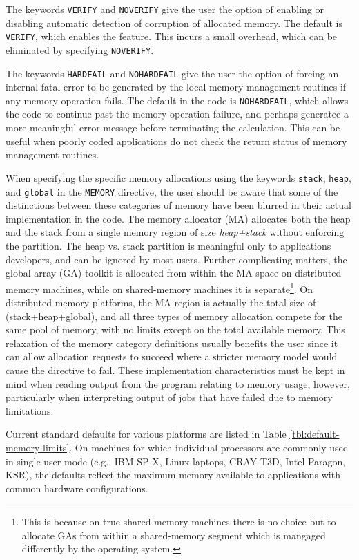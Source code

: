 The keywords \verb+VERIFY+ and \verb+NOVERIFY+ give the user the option
of enabling or disabling automatic
detection of corruption of allocated memory.  The default is \verb+VERIFY+,
which enables the feature. This incurs a small overhead, which can be 
eliminated by
specifying \verb+NOVERIFY+.  

The keywords \verb+HARDFAIL+ and \verb+NOHARDFAIL+  give the user the
option of forcing an internal fatal error to be generated by the local
memory management routines if any memory operation fails.  The default
in the code is \verb+NOHARDFAIL+, which allows the code to continue past
the memory operation failure, and perhaps generatee a more meaningful error
message before terminating the calculation.   This can be useful when
poorly coded applications do not check the return status of memory
management routines.


When specifying the specific memory allocations using the keywords
\verb+stack+, \verb+heap+, and \verb+global+ in the \verb+MEMORY+
directive, the user should be aware that some of the distinctions between 
these categories of memory have been blurred in their actual implementation 
in the code.  The memory allocator
(MA) allocates both the heap and the stack from a single memory region
of size {\em heap+stack} without enforcing the partition.  The heap
vs. stack partition is meaningful only to applications
developers, and can be ignored by most users.  Further complicating matters,
the global array (GA) toolkit is allocated from within the MA space on
distributed memory machines, while on shared-memory machines it is
separate\footnote{This is because on true shared-memory machines there
  is no choice but to allocate GAs from within a shared-memory segment
  which is mangaged differently by the operating system.}.  On
distributed memory platforms, the MA region is actually the total size of
(stack+heap+global), and all three types of memory allocation compete
for the same pool of memory, with no limits except on the total
available memory.  This relaxation of the memory category definitions 
usually benefits the user since it can allow allocation requests to 
succeed where a stricter memory model would cause the directive to fail.  
These implementation characteristics must be kept in mind when
reading output from the program relating to memory usage, however,
particularly when interpreting output of jobs that have
failed due to memory limitations.

Current standard defaults for various platforms are listed in Table
\ref{tbl:default-memory-limits}.  On machines for which individual
processors are commonly used in single user mode (e.g., IBM SP-X,
Linux laptops, CRAY-T3D, Intel Paragon, KSR), the defaults reflect
the maximum memory available to applications with common hardware
configurations.

